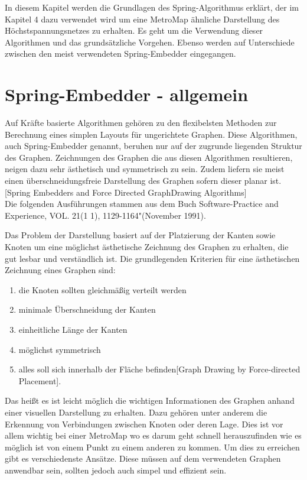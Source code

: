 In diesem Kapitel werden die Grundlagen des Spring-Algorithmus erklärt, der im Kapitel 4 dazu verwendet wird um eine MetroMap ähnliche Darstellung des Höchstspannungsnetzes zu erhalten. Es geht um die Verwendung dieser Algorithmen und das grundsätzliche Vorgehen. Ebenso werden auf Unterschiede zwischen den meist verwendeten Spring-Embedder eingegangen.

\section{Spring-Embedder - allgemein}
\label{Kapitel_3_-_Unterkapitel_2}

Auf Kräfte basierte Algorithmen gehören zu den flexibelsten Methoden zur Berechnung eines simplen Layouts für ungerichtete Graphen. Diese Algorithmen, auch Spring-Embedder genannt, beruhen nur auf der zugrunde liegenden Struktur des Graphen. Zeichnungen des Graphen die aus diesen Algorithmen resultieren, neigen dazu sehr ästhetisch und symmetrisch zu sein. Zudem liefern sie meist einen überschneidungsfreie Darstellung des Graphen sofern dieser planar ist.[Spring Embedders and Force Directed GraphDrawing Algorithms] \\

Die folgenden Ausführungen stammen aus dem Buch \grqq Software-Practice and Experience, VOL. 21(1 1), 1129-1164"(November 1991).

 
Das Problem der Darstellung basiert auf der Platzierung der Kanten sowie
Knoten um eine möglichst ästhetische Zeichnung des
Graphen zu erhalten, die gut lesbar und verständlich ist. Die grundlegenden Kriterien für eine ästhetischen Zeichnung eines Graphen sind:
\begin{enumerate}
	\item die Knoten sollten gleichmäßig verteilt werden
	\item minimale Überschneidung der Kanten
	\item einheitliche Länge der Kanten
	\item möglichst symmetrisch
	\item alles soll sich innerhalb der Fläche befinden[Graph Drawing by Force-directed Placement].
\end{enumerate}   

Das heißt es ist leicht möglich die wichtigen Informationen des Graphen anhand einer visuellen Darstellung zu erhalten. Dazu gehören unter anderem die Erkennung von Verbindungen zwischen Knoten oder deren Lage. Dies ist vor allem wichtig bei einer MetroMap wo es darum geht schnell herauszufinden wie es möglich ist von einem Punkt zu einem anderen zu kommen. Um dies zu erreichen gibt es verschiedenste Ansätze. Diese müssen auf dem verwendeten Graphen anwendbar sein, sollten jedoch auch simpel und effizient sein.\\


